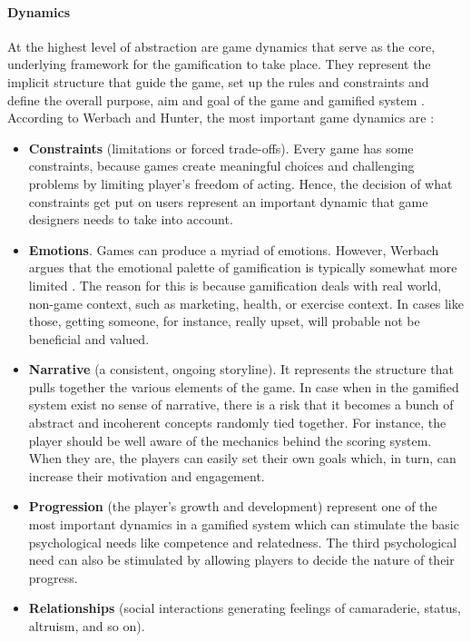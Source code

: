 \paragraph{Dynamics}
At the highest level of abstraction are game dynamics that serve as the core, underlying framework for the gamification to take place. They represent the implicit structure that guide the game, set up the rules and constraints and define the overall purpose, aim and goal of the game and gamified system \cite{werbach2012win, WerbachCoursera}. According to Werbach and Hunter, the most important game dynamics are \cite{werbach2012win}:
\begin{itemize}
\item \textbf{Constraints} (limitations or forced trade-offs). Every game has some constraints, because games create meaningful choices and challenging problems by limiting player's freedom of acting. Hence, the decision of what constraints get put on users represent an important dynamic that game designers needs to take into account. 
\item \textbf{Emotions}. Games can produce a myriad of
emotions. However, Werbach argues that the emotional palette of gamification is typically somewhat more limited \cite{WerbachCoursera}. The reason for this is because gamification deals with real world, non-game context, such as marketing, health, or exercise context. In cases like those, getting someone, for instance, really upset, will probable not be beneficial and valued.
\item \textbf{Narrative} (a consistent, ongoing storyline). It represents the structure that pulls together the various elements of the game. In case when in the gamified system exist no sense of narrative, there is a risk that it becomes a bunch of abstract and incoherent concepts randomly tied together. For instance, the player should be well aware of the mechanics behind the scoring system. When they are, the players can easily set their own goals which, in turn, can increase their motivation and engagement.
\item \textbf{Progression} (the player's growth and development) represent one of the most important dynamics in a gamified system which can stimulate the basic psychological needs like competence and relatedness. The third psychological need can also be stimulated by allowing players to decide the nature of their progress.
\item \textbf{Relationships} (social interactions generating feelings of camaraderie, status, altruism, and so on).
\end{itemize}
